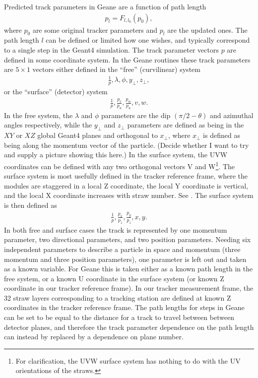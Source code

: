 Predicted track parameters in Geane are a function of path length 
        \begin{align} \label{eq:pp}
            p_{l} = F_{l,l_{0}}(p_{0}),
        \end{align}
where $p_{0}$ are some original tracker parameters and $p_{l}$ are the updated ones. The path length $l$ can be defined or limited how one wishes, and typically correspond to a single step in the Geant4 simulation. The track parameter vectors $p$ are defined in some coordinate system. In the Geane routines these track parameters are $5 \times 1$ vectors either defined in the ``free'' (curvilinear) system
        \begin{align}
            \frac{1}{p}, \lambda, \phi, y_{\perp}, z_{\perp},
        \end{align}
or the ``surface'' (detector) system 
        \begin{align}
            \frac{1}{p}, \frac{p_{v}}{p_{u}}, \frac{p_{w}}{p_{u}}, v, w.
        \end{align}
In the free system, the $\lambda$ and $\phi$ parameters are the dip $(\pi/2 - \theta)$ and azimuthal angles respectively, while the $y_{\perp}$ and $z_{\perp}$ parameters are defined as being in the $XY$ or $XZ$ global Geant4 planes and orthogonal to $x_{\perp}$, where $x_{\perp}$ is defined as being along the momentum vector of the particle. (Decide whether I want to try and supply a picture showing this here.) In the surface system, the UVW coordinates can be defined with any two orthogonal vectors V and W\footnote{For clarification, the UVW surface system has nothing to do with the UV orientations of the straws.}. The surface system is most usefully defined in the tracker reference frame, where the modules are staggered in a local Z coordinate, the local Y coordinate is vertical, and the local X coordinate increases with straw number. See . The surface system is then defined as
        \begin{align}
            \frac{1}{p}, \frac{p_{x}}{p_{z}}, \frac{p_{y}}{p_{z}}, x, y.
        \end{align}
In both free and surface cases the track is represented by one momentum parameter, two directional parameters, and two position parameters. Needing six independent parameters to describe a particle in space and momentum (three momentum and three position parameters), one parameter is left out and taken as a known variable. For Geane this is taken either as a known path length in the free system, or a known U coordinate in the surface system (or known Z coordinate in our tracker reference frame). In our tracker measurement frame, the 32 straw layers corresponding to a tracking station are defined at known Z coordinates in the tracker reference frame. The path lengths for steps in Geane can be set to be equal to the distance for a track to travel between between detector planes, and therefore the track parameter dependence on the path length can instead by replaced by a dependence on plane number.


